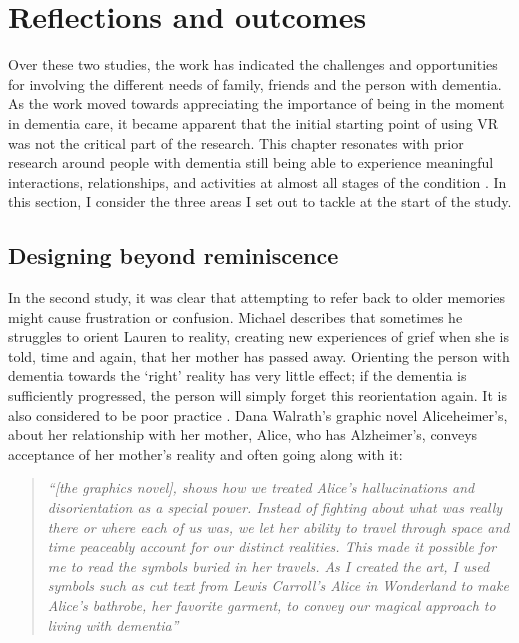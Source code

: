 \section{Reflections and outcomes}
\label{S2:Reflection}
Over these two studies, the work has indicated the challenges and opportunities for involving the different needs of family, friends and the person with dementia. As the work moved towards appreciating the importance of being in the moment in dementia care, it became apparent that the initial starting point of using VR was not the critical part of the research. This chapter resonates with prior research around people with dementia still being able to experience meaningful interactions, relationships, and activities at almost all stages of the condition \citep{kitwood1997dementia}. In this section, I consider the three areas I set out to tackle at the start of the study.

\subsection{Designing beyond reminiscence}
\label{beyond-reminiscence}
In the second study, it was clear that attempting to refer back to older memories might cause frustration or confusion. Michael describes that sometimes he struggles to orient Lauren to reality, creating new experiences of grief when she is told, time and again, that her mother has passed away. Orienting the person with dementia towards the `right' reality has very little effect; if the dementia is sufficiently progressed, the person will simply forget this reorientation again. It is also considered to be poor practice \citep{cipriani_understanding_2014}. Dana Walrath's graphic novel Aliceheimer's, about her relationship with her mother, Alice, who has Alzheimer's, conveys acceptance of her mother's reality and often going along with it:

\begin{quote}
\textit{``[the graphics novel], shows how we treated Alice's hallucinations and disorientation as a special power. Instead of fighting about what was really there or where each of us was, we let her ability to travel through space and time peaceably account for our distinct realities. This made it possible for me to read the symbols buried in her travels. As I created the art, I used symbols such as cut text from Lewis Carroll's Alice in Wonderland to make Alice's bathrobe, her favorite garment, to convey our magical approach to living with dementia''}\citep{walrath2021aliceheimer,walrath2017end}
\end{quote}

